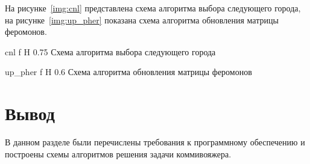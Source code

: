 На рисунке~\ref{img:cnl} представлена схема алгоритма выбора следующего города, на рисунке~\ref{img:up_pher} показана схема алгоритма обновления матрицы феромонов.

{cnl}
{f}
{H}
{0.75\textwidth}
{Схема алгоритма выбора следующего города}

{up_pher}
{f}
{H}
{0.6\textwidth}
{Схема алгоритма обновления матрицы феромонов}

\section*{Вывод}

В данном разделе были перечислены требования к программному обеспечению и построены схемы алгоритмов решения задачи коммивояжера.
